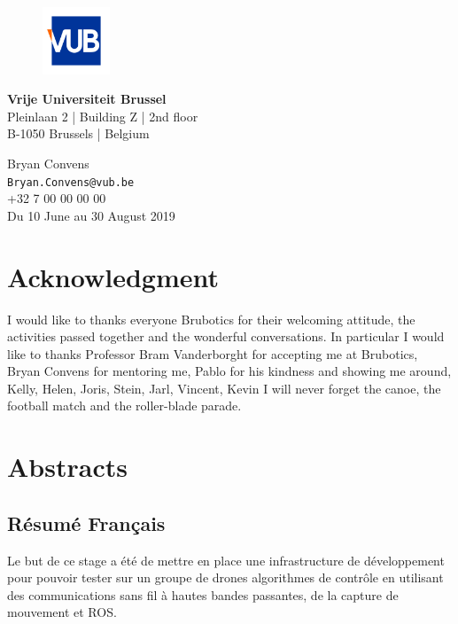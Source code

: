 \begin{titlepage}
 \vfill
 \begin{figure}[h!]
  \hspace{0.29cm}
  \includegraphics[width=2cm]{logos/vub_logo.jpg}
 \end{figure}
 \begin{minipage}{8cm}
  \textbf{Vrije Universiteit Brussel}\\
  Pleinlaan 2 | Building Z | 2nd floor\\
  B-1050 Brussels | Belgium
 \end{minipage} \hfill
 \begin{minipage}{7cm}
  \begin{flushright}
   Bryan Convens\\
   \texttt{Bryan.Convens@vub.be}\\
   +32 7 00 00 00 00\\ \vspace{0.2cm}
   Du 10 June au 30 August 2019
  \end{flushright}
 \end{minipage}

\end{titlepage}


\chapter*{Acknowledgment}
I would like to thanks everyone Brubotics for their welcoming attitude,
the activities passed together and the wonderful conversations.
In particular I would like to thanks Professor Bram Vanderborght for accepting me at Brubotics,
Bryan Convens for mentoring me, Pablo for his kindness and showing me around,
Kelly, Helen, Joris, Stein, Jarl, Vincent, Kevin I will never forget the canoe, the football match and the roller-blade parade.

\chapter*{Abstracts}
\section*{Résumé Français}
Le but de ce stage a été de mettre en place une infrastructure de développement pour pouvoir tester sur un groupe de drones algorithmes de contrôle en utilisant des communications sans fil à hautes bandes passantes, de la capture de mouvement et ROS.

